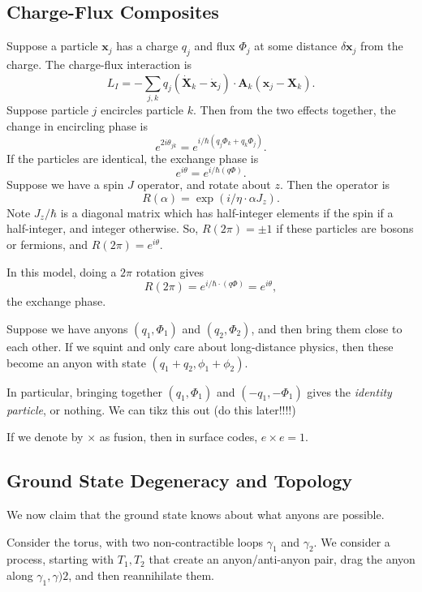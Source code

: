 \documentclass[12pt]{article}
\begin{document}
\subsection{Charge-Flux Composites}%
\label{sub:cfc}

Suppose a particle $\mathbf{x}_j$ has a charge $q_j$ and flux $\Phi_j$ at some distance $\delta \mathbf{x}_j$ from the charge. The charge-flux interaction is
\[
L_I = -\sum_{j, k} q_j(\mathbf{\dot X}_k - \mathbf{\dot x}_j) \cdot \mathbf{A}_k(\mathbf{x}_j - \mathbf{X}_k).
\]
Suppose particle $j$ encircles particle $k$. Then from the two effects together, the change in encircling phase is
\[
e^{2 i \theta_{jk}} = e^{i/\hbar(q_j \Phi_k + q_k \Phi_j)}.
\]
If the particles are identical, the exchange phase is
\[
e^{i \theta} = e^{i/\hbar(q \Phi)}.
\]
Suppose we have a spin $J$ operator, and rotate about $z$. Then the operator is
\[
R(\alpha) = \exp( i/\eta \cdot \alpha J_z).
\]
Note $J_z/\hbar$ is a diagonal matrix which has half-integer elements if the spin if a half-integer, and integer otherwise. So, $R(2\pi) = \pm 1$ if these particles are bosons or fermions, and $R(2 \pi) = e^{i\theta}$.

In this model, doing a $2 \pi$ rotation gives
\[
R(2 \pi) = e^{i/\hbar \cdot (q \Phi)} = e^{i \theta},
\]
the exchange phase.

Suppose we have anyons $(q_1, \Phi_1)$ and $(q_2, \Phi_2)$, and then bring them close to each other. If we squint and only care about long-distance physics, then these become an anyon with state $(q_1 + q_2, \phi_1 + \phi_2)$.

In particular, bringing together $(q_1, \Phi_1)$ and $(-q_1, -\Phi_1)$ gives the \emph{identity particle}, or nothing. We can tikz this out (do this later!!!!)

If we denote by $\times$ as fusion, then in surface codes, $e \times e = 1$.

\subsection{Ground State Degeneracy and Topology}%
\label{sub:gsdt}

We now claim that the ground state knows about what anyons are possible.

Consider the torus, with two non-contractible loops $\gamma_1$ and $\gamma_2$. We consider a process, starting with $T_1, T_2$ that create an anyon/anti-anyon pair, drag the anyon along $\gamma_1, \gamma)2$, and then reannihilate them.
\end{document}
